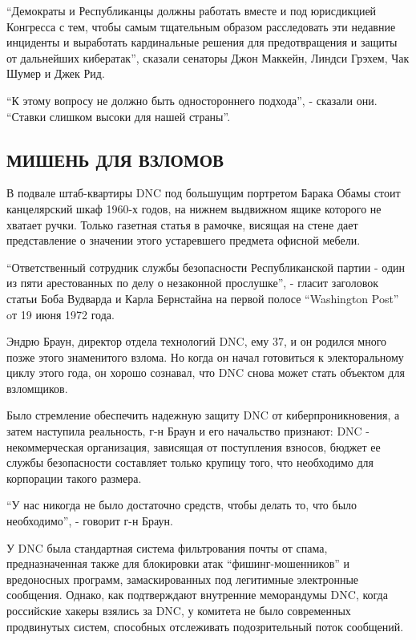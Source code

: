``Демократы и Республиканцы должны работать вместе и под юрисдикцией
Конгресса с тем, чтобы самым тщательным образом расследовать эти
недавние инциденты и выработать кардинальные решения для предотвращения
и защиты от дальнейших кибератак'', сказали сенаторы Джон Маккейн,
Линдси Грэхем, Чак Шумер и Джек Рид.

``К этому вопросу не должно быть одностороннего подхода'', - сказали
они. ``Ставки слишком высоки для нашей страны''.

\hypertarget{ux43cux438ux448ux435ux43dux44c-ux434ux43bux44f-ux432ux437ux43bux43eux43cux43eux432}{%
\subsection{\texorpdfstring{\textbf{МИШЕНЬ ДЛЯ
ВЗЛОМОВ}}{МИШЕНЬ ДЛЯ ВЗЛОМОВ}}\label{ux43cux438ux448ux435ux43dux44c-ux434ux43bux44f-ux432ux437ux43bux43eux43cux43eux432}}

В подвале штаб-квартиры DNC под большущим портретом Барака Обамы стоит
канцелярский шкаф 1960-х годов, на нижнем выдвижном ящике которого не
хватает ручки. Только газетная статья в рамочке, висящая на стене дает
представление о значении этого устаревшего предмета офисной мебели.

``Ответственный сотрудник службы безопасности Республиканской партии -
один из пяти арестованных по делу о незаконной прослушке'', - гласит
заголовок статьи Боба Вудварда и Карла Бернстайна на первой полосе
``Washington Post'' oт 19 июня 1972 года.

Эндрю Браун, директор отдела технологий DNC, ему 37, и он родился много
позже этого знаменитого взлома. Но когда он начал готовиться к
электоральному циклу этого года, он хорошо сознавал, что DNC снова может
стать объектом для взломщиков.

Было стремление обеспечить надежную защиту DNC от киберпроникновения, а
затем наступила реальность, г-н Браун и его начальство признают: DNC -
некоммерческая организация, зависящая от поступления взносов, бюджет ее
службы безопасности составляет только крупицу того, что необходимо для
корпорации такого размера.

``У нас никогда не было достаточно средств, чтобы делать то, что было
необходимо'', - говорит г-н Браун.

У DNC была стандартная система фильтрования почты от спама,
предназначенная также для блокировки атак ``фишинг-мошенников'' и
вредоносных программ, замаскированных под легитимные электронные
сообщения. Однако, как подтверждают внутренние меморандумы DNC, когда
российские хакеры взялись за DNC, у комитета не было современных
продвинутых систем, способных отслеживать подозрительный поток
сообщений.

